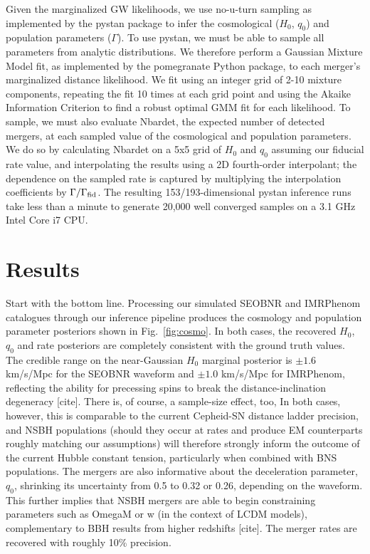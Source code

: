 \documentclass[twocolumn]{aastex63}
\begin{document}
Given the marginalized GW likelihoods, we use no-u-turn sampling as implemented by the pystan package to infer the cosmological ($H_0$, $q_0$) and population parameters ($\Gamma$). To use pystan, we must be able to sample all parameters from analytic distributions. We therefore perform a Gaussian Mixture Model fit, as implemented by the pomegranate Python package, to each merger's marginalized distance likelihood. We fit using an integer grid of 2-10 mixture components, repeating the fit 10 times at each grid point and using the Akaike Information Criterion to find a robust optimal GMM fit for each likelihood. To sample, we must also evaluate Nbardet, the expected number of detected mergers, at each sampled value of the cosmological and population parameters. We do so by calculating Nbardet on a 5x5 grid of $H_0$ and $q_0$ assuming our fiducial rate value, and interpolating the results using a 2D fourth-order interpolant; the dependence on the sampled rate is captured by multiplying the interpolation coefficients by $\Gamma/\Gamma_{\rm fid}$. The resulting 153/193-dimensional pystan inference runs take less than a minute to generate 20,000 well converged samples on a 3.1 GHz Intel Core i7 CPU.

\section{Results} \label{sec:results}

Start with the bottom line. Processing our simulated SEOBNR and IMRPhenom catalogues through our inference pipeline produces the cosmology and population parameter posteriors shown in Fig.~\ref{fig:cosmo}. In both cases, the recovered $H_0$, $q_0$ and rate posteriors are completely consistent with the ground truth values. The credible range on the near-Gaussian $H_0$ marginal posterior is $\pm 1.6$ km/s/Mpc for the SEOBNR waveform and $\pm 1.0$ km/s/Mpc for IMRPhenom, reflecting the ability for precessing spins to break the distance-inclination degeneracy [cite]. There is, of course, a sample-size effect, too,  In both cases, however, this is comparable to the current Cepheid-SN distance ladder precision, and NSBH populations (should they occur at rates and produce EM counterparts roughly matching our assumptions) will therefore strongly inform the outcome of the current Hubble constant tension, particularly when combined with BNS populations. The mergers are also informative about the deceleration parameter, $q_0$, shrinking its uncertainty from 0.5 to 0.32 or 0.26, depending on the waveform. This further implies that NSBH mergers are able to begin constraining parameters such as OmegaM or w (in the context of LCDM models), complementary to BBH results from higher redshifts [cite]. The merger rates are recovered with roughly 10\% precision.
\end{document}
